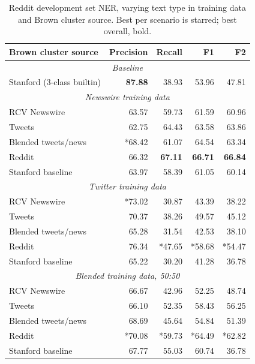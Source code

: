 \documentclass[10pt,journal,compsoc]{IEEEtran}
\begin{document}
\begin{table}
\centering
\caption{Reddit development set NER, varying text type in training data and Brown cluster source. Best per scenario is starred; best overall, bold.}
\begin{tabular}{lrrrr}
\hline
{\bf Brown cluster source} & {\bf Precision} & {\bf Recall} & {\bf F1} & {\bf F2} \\
\hline
\multicolumn{5}{c}{\emph{Baseline}} \\
\hline
Stanford (3-class builtin)   & {\bf 87.88} & 38.93 & 53.96 & 47.81 \\
\hline
\multicolumn{5}{c}{\emph{Newswire training data}} \\
\hline
RCV Newswire          & 63.57 & 59.73 & 61.59 & 60.96 \\
Tweets                & 62.75 & 64.43 & 63.58 & 63.86 \\
Blended tweets/news   &*68.42 & 61.07 & 64.54 & 63.34 \\
Reddit                & 66.32 & {\bf 67.11} & {\bf 66.71} & {\bf 66.84} \\
Stanford baseline     & 63.97 & 58.39 & 61.05 & 60.14 \\
\hline
\multicolumn{5}{c}{\emph{Twitter training data}} \\
\hline
RCV Newswire          &*73.02 & 30.87 & 43.39 & 38.22 \\
Tweets                & 70.37 & 38.26 & 49.57 & 45.12 \\
Blended tweets/news   & 65.28 & 31.54 & 42.53 & 38.10 \\
Reddit                & 76.34 &*47.65 &*58.68 &*54.47 \\
Stanford baseline     & 65.22 & 30.20 & 41.28 & 36.78 \\
\hline
\multicolumn{5}{c}{\emph{Blended training data, 50:50}} \\
\hline
RCV Newswire          & 66.67 & 42.96 & 52.25 & 48.74 \\
Tweets                & 66.10 & 52.35 & 58.43 & 56.25 \\
Blended tweets/news   & 68.69 & 45.64 & 54.84 & 51.39 \\
Reddit                &*70.08 &*59.73 &*64.49 &*62.82 \\
Stanford baseline     & 67.77 & 55.03 & 60.74 & 36.78 \\
\hline
\end{tabular}
\label{tab:brown-tuning}
\end{table}
\end{document}
